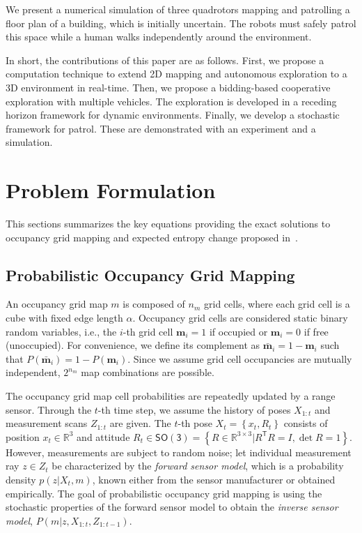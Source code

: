 \documentclass[smallextended]{svjour3}       %
\newcommand{\braces}[1]{\ensuremath{\left\{ #1 \right\}}}
\newcommand{\SO}{\ensuremath{\mathsf{SO(3)}}}
\newcommand{\T}{\ensuremath{\mathsf{T}}}
\renewcommand{\Re}{\ensuremath{\mathbb{R}}}
\begin{document}
We present a numerical simulation of three quadrotors mapping and patrolling a floor plan of a building, which is initially uncertain. The robots must safely patrol this space while a human walks independently around the environment.

In short, the contributions of this paper are as follows. First, we propose a computation technique to extend 2D mapping and autonomous exploration to a 3D environment in real-time. Then, we propose a bidding-based cooperative exploration with multiple vehicles. The exploration is developed in a receding horizon framework for dynamic environments. Finally, we develop a stochastic framework for patrol. These are demonstrated with an experiment and a simulation.





\section{Problem Formulation}
\label{sec:ProbDef}

This sections summarizes the key equations providing the exact solutions to occupancy grid mapping and expected entropy change proposed in~\cite{KauLeeAiMos16,KauTakAiLee17,KauTakAiLee18,KauAiLee16}.

\subsection{Probabilistic Occupancy Grid Mapping}
\label{subsec:POGM}
An occupancy grid map $m$ is composed of $n_m$ grid cells, where each grid cell is a cube with fixed edge length $\alpha$. Occupancy grid cells are considered static binary random variables, i.e., the $i$-th grid cell $\mathbf{m}_i=1$ if occupied or $\mathbf{m}_i=0$ if free (unoccupied). For convenience, we define its complement as $\bar{\mathbf{m}}_i=1-\mathbf{m}_i$ such that $P(\bar{\mathbf{m}}_i)=1-P(\mathbf{m}_i)$. Since we assume grid cell occupancies are mutually independent, $2^{n_m}$ map combinations are possible.

The occupancy grid map cell probabilities are repeatedly updated by a range sensor. Through the $t$-th time step, we assume the history of poses $X_{1:t}$ and measurement scans $Z_{1:t}$ are given. The $t$-th pose $X_t=\braces{x_t,R_t}$ consists of position $x_t\in\Re^3$ and attitude $R_t\in\SO=\braces{R\in\Re^{3\times3}|R^\T R=I,\det{R}=1}$. However, measurements are subject to random noise; let individual measurement ray $z\in Z_t$ be characterized by the \emph{forward sensor model}, which is a probability density $p(z|X_t,m)$, known either from the sensor manufacturer or obtained empirically. The goal of probabilistic occupancy grid mapping is using the stochastic properties of the forward sensor model to obtain the \emph{inverse sensor model}, $P(m|z,X_{1:t},Z_{1:t-1})$.
\end{document}
